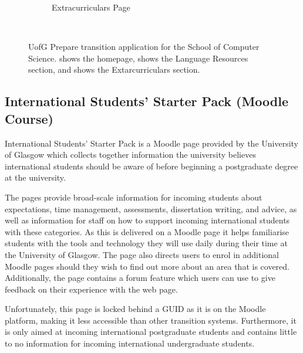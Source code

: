 \documentclass{l4proj}
\begin{document}
\begin{figure}[ht]
\begin{subfigure}[b]{0.25\textwidth}
        \caption{Extracurriculars Page}
        \label{fig:preparesrc}
    \end{subfigure}
    ~ %
    \caption{UofG Prepare transition application for the School of Computer Science.  shows the homepage,   shows the Language Resources section,  and  shows the Extarcurriculars section.
    }\label{fig:prepare}
\end{figure}

\subsection{International Students' Starter Pack (Moodle Course)}
International Students' Starter Pack is a Moodle page provided by the University of Glasgow which collects together information the university believes international students should be aware of before beginning a postgraduate degree at the university.

The pages provide broad-scale information for incoming students about expectations,  time management,  assessments,  dissertation writing,  and advice,  as well as information for staff on how to support incoming international students with these categories. As this is delivered on a Moodle page it helps familiarise students with the tools and technology they will use daily during their time at the University of Glasgow. The page also directs users to enrol in additional Moodle pages should they wish to find out more about an area that is covered. Additionally,  the page contains a forum feature which users can use to give feedback on their experience with the web page. 

Unfortunately,  this page is locked behind a GUID as it is on the Moodle platform,  making it less accessible than other transition systems. Furthermore,  it is only aimed at incoming international postgraduate students and contains little to no information for incoming international undergraduate students.

\end{document}
